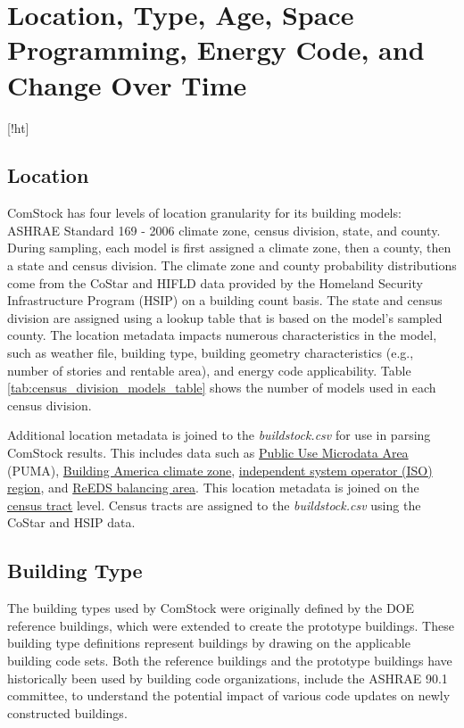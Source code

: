 \section{Location, Type, Age, Space Programming, Energy Code, and Change Over Time}[!ht]
\subsection{Location}

ComStock has four levels of location granularity for its building models: ASHRAE Standard 169 - 2006 climate zone, census division, state, and county. During sampling, each model is first assigned a climate zone, then a county, then a state and census division. The climate zone and county probability distributions come from the CoStar and HIFLD data provided by the Homeland Security Infrastructure Program (HSIP) on a building count basis. The state and census division are assigned using a lookup table that is based on the model's sampled county. The location metadata impacts numerous characteristics in the model, such as weather file, building type, building geometry characteristics (e.g., number of stories and rentable area), and energy code applicability. Table  \ref{tab:census_division_models_table} shows the number of models used in each census division.

Additional location metadata is joined to the \emph{buildstock.csv} for use in parsing ComStock results. This includes data such as \href{https://www.census.gov/programs-surveys/geography/guidance/geo-areas/pumas.html}{Public Use Microdata Area} (PUMA), \href{https://www.energy.gov/eere/buildings/building-america-climate-specific-guidance}{Building America climate zone}, \href{https://isorto.org/}{independent system operator (ISO) region}, and \href{https://www.nrel.gov/analysis/reeds}{ReEDS balancing area}. This location metadata is joined on the \href{https://www2.census.gov/geo/pdfs/education/CensusTracts.pdf}{census tract} level. Census tracts are assigned to the \emph{buildstock.csv} using the CoStar and HSIP data.



\subsection{Building Type} 
\label{sec:building_type_meta}

The building types used by ComStock were originally defined by the DOE reference buildings, which were extended to create the prototype buildings. These building type definitions represent buildings by drawing on the applicable building code sets. Both the reference buildings and the prototype buildings have historically been used by building code organizations, include the ASHRAE 90.1 committee, to understand the potential impact of various code updates on newly constructed buildings.

